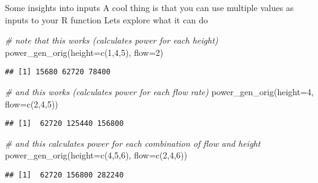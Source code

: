 \documentclass[
  ignorenonframetext,
]{beamer}
\newenvironment{Shaded}{\begin{snugshade}}{\end{snugshade}}
\newcommand{\AttributeTok}[1]{\textcolor[rgb]{0.77,0.63,0.00}{#1}}
\newcommand{\CommentTok}[1]{\textcolor[rgb]{0.56,0.35,0.01}{\textit{#1}}}
\newcommand{\DecValTok}[1]{\textcolor[rgb]{0.00,0.00,0.81}{#1}}
\newcommand{\FunctionTok}[1]{\textcolor[rgb]{0.00,0.00,0.00}{#1}}
\newcommand{\NormalTok}[1]{#1}
\begin{document}
\begin{frame}[fragile]{Some insights into inputs}
\protect\hypertarget{some-insights-into-inputs}{}
A cool thing is that you can use multiple values as inputs to your R
function Lets explore what it can do

\begin{Shaded}
\begin{Highlighting}[]
\CommentTok{\# note that this works (calculates power for each height)}
\FunctionTok{power\_gen\_orig}\NormalTok{(}\AttributeTok{height=}\FunctionTok{c}\NormalTok{(}\DecValTok{1}\NormalTok{,}\DecValTok{4}\NormalTok{,}\DecValTok{5}\NormalTok{), }\AttributeTok{flow=}\DecValTok{2}\NormalTok{)}
\end{Highlighting}
\end{Shaded}

\begin{verbatim}
## [1] 15680 62720 78400
\end{verbatim}

\begin{Shaded}
\begin{Highlighting}[]
\CommentTok{\# and this works (calculates power for each flow rate)}
\FunctionTok{power\_gen\_orig}\NormalTok{(}\AttributeTok{height=}\DecValTok{4}\NormalTok{, }\AttributeTok{flow=}\FunctionTok{c}\NormalTok{(}\DecValTok{2}\NormalTok{,}\DecValTok{4}\NormalTok{,}\DecValTok{5}\NormalTok{))}
\end{Highlighting}
\end{Shaded}

\begin{verbatim}
## [1]  62720 125440 156800
\end{verbatim}

\begin{Shaded}
\begin{Highlighting}[]
\CommentTok{\# and this calculates power for each combination of flow and height}
\FunctionTok{power\_gen\_orig}\NormalTok{(}\AttributeTok{height=}\FunctionTok{c}\NormalTok{(}\DecValTok{4}\NormalTok{,}\DecValTok{5}\NormalTok{,}\DecValTok{6}\NormalTok{), }\AttributeTok{flow=}\FunctionTok{c}\NormalTok{(}\DecValTok{2}\NormalTok{,}\DecValTok{4}\NormalTok{,}\DecValTok{6}\NormalTok{))}
\end{Highlighting}
\end{Shaded}

\begin{verbatim}
## [1]  62720 156800 282240
\end{verbatim}


\end{frame}
\end{document}
